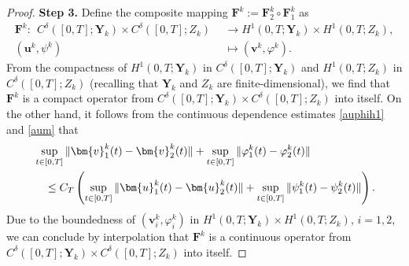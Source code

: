 \documentclass[11pt,reqno]{amsart}
\def\be{\begin{equation}}
\def\ee{\end{equation}}
\begin{document}
\begin{proof}
\textbf{Step 3.} Define the composite mapping $\mathbf{F}^k:=\mathbf{F}_{2}^k\circ \mathbf{F}_{1}^k $ as
\begin{align*}
\mathbf{F}^k:\ \ C^\delta([0,T];\bm{Y}_{k}) \times C^\delta([0,T];Z_{k}) \ &\ \to H^1(0,T;\bm{Y}_{k})\times H^1(0,T;Z_{k}),
\\
(\bm{u}^k,\psi^k)\ &\ \mapsto(\bm{v}^{k},\varphi^k).
\end{align*}
%
From the compactness of $H^1(0,T;\bm{Y}_{k})$ in
$C^\delta([0,T];\bm{Y}_{k})$ and $H^1(0,T;Z_{k})$ in
$C^\delta([0,T];Z_{k})$ (recalling that $\bm{Y}_{k}$ and $Z_{k}$ are finite-dimensional), we find that $\mathbf{F}^k$ is a compact operator from $C^\delta([0,T];\bm{Y}_{k}) \times C^\delta([0,T];Z_{k})$ into itself.
On the other hand, it follows from the continuous dependence estimates \eqref{auphih1} and \eqref{aum} that
\be
\begin{aligned}
&\sup_{t\in [0,T]}\|\bm{v}_1^{k}(t)-\bm{v}^{k}_2(t)\| +
\sup_{t\in [0,T]}\|\varphi_1^{k}(t)-\varphi^{k}_2(t)\|
\\
&\quad \leq C_T\left(\sup_{t\in [0,T]}\|\bm{u}_1^{k}(t)-\bm{u}_2^{k}(t)\|
+\sup_{t\in [0,T]}\|\psi_1^{k}(t)-\psi_2^{k}(t)\|\right).
\end{aligned}
\notag
\ee
Due to the boundedness of $(\bm{v}^k_i,\varphi^k_i)$ in $H^1(0,T;\bm{Y}_{k})\times H^1(0,T;Z_{k})$, $i=1,2$, we can conclude by interpolation that $\mathbf{F}^k$ is a continuous operator from $C^\delta([0,T];\bm{Y}_{k}) \times C^\delta([0,T];Z_{k})$ into itself.


\end{proof}
\end{document}
